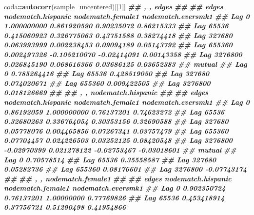 \documentclass[
]{book}
\newenvironment{Shaded}{\begin{snugshade}}{\end{snugshade}}
\newcommand{\DecValTok}[1]{\textcolor[rgb]{0.00,0.00,0.81}{#1}}
\newcommand{\DocumentationTok}[1]{\textcolor[rgb]{0.56,0.35,0.01}{\textbf{\textit{#1}}}}
\newcommand{\FunctionTok}[1]{\textcolor[rgb]{0.13,0.29,0.53}{\textbf{#1}}}
\newcommand{\NormalTok}[1]{#1}
\newcommand{\SpecialCharTok}[1]{\textcolor[rgb]{0.81,0.36,0.00}{\textbf{#1}}}
\begin{document}
\begin{enumerate}
\begin{Shaded}
\begin{Highlighting}[]
\NormalTok{coda}\SpecialCharTok{::}\FunctionTok{autocorr}\NormalTok{(sample\_uncentered)[[}\DecValTok{1}\NormalTok{]]}
\DocumentationTok{\#\# , , edges}
\DocumentationTok{\#\# }
\DocumentationTok{\#\#                   edges nodematch.hispanic nodematch.female1 nodematch.eversmk1}
\DocumentationTok{\#\# Lag 0       1.000000000        0.861920590        0.90235072         0.86215333}
\DocumentationTok{\#\# Lag 65536   0.415060923        0.326775063        0.43751588         0.38274418}
\DocumentationTok{\#\# Lag 327680  0.063993999        0.002238453        0.09094189         0.05143792}
\DocumentationTok{\#\# Lag 655360  0.002497326       {-}0.105210070       {-}0.02414091         0.00143358}
\DocumentationTok{\#\# Lag 3276800 0.026845190        0.068616366        0.03686125         0.03652383}
\DocumentationTok{\#\#                  mutual}
\DocumentationTok{\#\# Lag 0       0.785264416}
\DocumentationTok{\#\# Lag 65536   0.428519050}
\DocumentationTok{\#\# Lag 327680  0.074020671}
\DocumentationTok{\#\# Lag 655360  0.009422505}
\DocumentationTok{\#\# Lag 3276800 0.018126669}
\DocumentationTok{\#\# }
\DocumentationTok{\#\# , , nodematch.hispanic}
\DocumentationTok{\#\# }
\DocumentationTok{\#\#                   edges nodematch.hispanic nodematch.female1 nodematch.eversmk1}
\DocumentationTok{\#\# Lag 0        0.86192059        1.000000000        0.76137201         0.74623272}
\DocumentationTok{\#\# Lag 65536    0.32680263        0.336764054        0.30353156         0.32690588}
\DocumentationTok{\#\# Lag 327680   0.05778076        0.004465856        0.07267341         0.03757479}
\DocumentationTok{\#\# Lag 655360   0.07704457        0.024226503        0.03252125         0.08420548}
\DocumentationTok{\#\# Lag 3276800 {-}0.02970399        0.021278122       {-}0.02753467        {-}0.03018601}
\DocumentationTok{\#\#                  mutual}
\DocumentationTok{\#\# Lag 0        0.70578514}
\DocumentationTok{\#\# Lag 65536    0.35558587}
\DocumentationTok{\#\# Lag 327680   0.05282736}
\DocumentationTok{\#\# Lag 655360   0.08176601}
\DocumentationTok{\#\# Lag 3276800 {-}0.07743174}
\DocumentationTok{\#\# }
\DocumentationTok{\#\# , , nodematch.female1}
\DocumentationTok{\#\# }
\DocumentationTok{\#\#                   edges nodematch.hispanic nodematch.female1 nodematch.eversmk1}
\DocumentationTok{\#\# Lag 0       0.902350724         0.76137201        1.00000000         0.77769826}
\DocumentationTok{\#\# Lag 65536   0.453418914         0.37756721        0.51290498         0.41954866}

\end{Highlighting}
\end{Shaded}
\end{enumerate}
\end{document}
